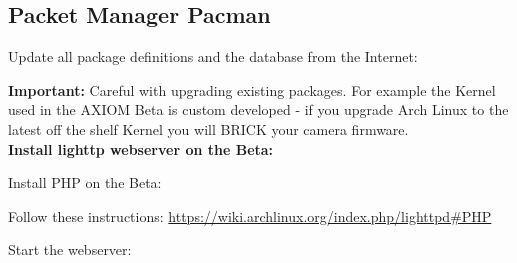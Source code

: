 \subsection{Packet Manager Pacman}

Update all package definitions and the database from the Internet: 


\textbf{Important:} Careful with upgrading existing packages. For example the Kernel used in the AXIOM Beta is custom developed - if you upgrade Arch Linux to the latest off the shelf Kernel you will BRICK your camera firmware.\\

\textbf{Install lighttp webserver on the Beta: }


Install PHP on the Beta: 


Follow these instructions: \href{https://wiki.archlinux.org/index.php/lighttpd#PHP}{https://wiki.archlinux.org/index.php/lighttpd\#PHP}

Start the webserver: 

